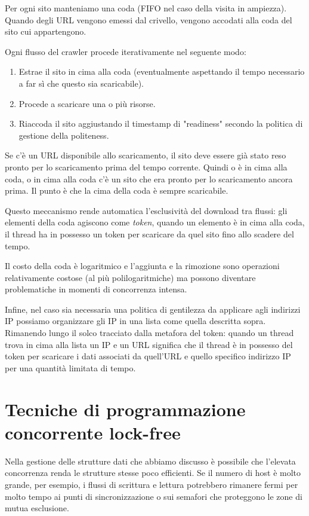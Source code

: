 Per ogni sito manteniamo una coda (FIFO nel caso della visita in ampiezza). Quando degli URL vengono emessi dal crivello, vengono accodati alla coda del sito cui appartengono.

Ogni flusso del crawler procede iterativamente nel seguente modo:
\begin{enumerate}
    \item Estrae il sito in cima alla coda (eventualmente aspettando il tempo necessario a far sì che questo sia scaricabile).
    \item Procede a scaricare una o più risorse.
    \item Riaccoda il sito aggiustando il timestamp di "readiness" secondo la politica di gestione della politeness.
\end{enumerate}
Se c'è un URL disponibile allo scaricamento, il sito deve essere già stato reso pronto per lo scaricamento prima del tempo corrente. Quindi o è in cima alla coda, o in cima alla coda c'è un sito che era pronto per lo scaricamento ancora prima. Il punto è che la cima della coda è sempre scaricabile.

Questo meccanismo rende automatica l'esclusività del download tra flussi: gli elementi della coda agiscono come \textit{token}, quando un elemento è in cima alla coda, il thread ha in possesso un token per scaricare da quel sito fino allo scadere del tempo.

Il costo della coda è logaritmico e l'aggiunta e la rimozione sono operazioni relativamente costose (al più polilogaritmiche) ma possono diventare problematiche in momenti di concorrenza intensa.

Infine, nel caso sia necessaria una politica di gentilezza da applicare agli indirizzi IP possiamo organizzare gli IP in una lista come quella descritta sopra. Rimanendo lungo il solco tracciato dalla metafora del token: quando un thread trova in cima alla lista un IP e un URL significa che il thread è in possesso del token per scaricare i dati associati da quell'URL e quello specifico indirizzo IP per una quantità limitata di tempo.
\section{Tecniche di programmazione concorrente lock-free}
Nella gestione delle strutture dati che abbiamo discusso è possibile che l'elevata concorrenza renda le strutture stesse poco efficienti. Se il numero di host è molto grande, per esempio, i flussi di scrittura e lettura potrebbero rimanere fermi per molto tempo ai punti di sincronizzazione o sui semafori che proteggono le zone di mutua esclusione.

